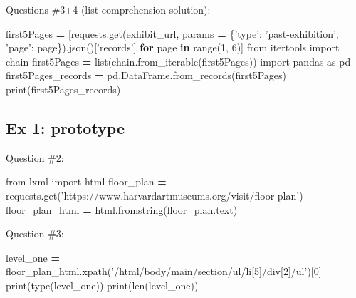 \documentclass[]{book}
\newenvironment{Shaded}{\begin{snugshade}}{\end{snugshade}}
\newcommand{\KeywordTok}[1]{\textcolor[rgb]{0.13,0.29,0.53}{\textbf{#1}}}
\newcommand{\DecValTok}[1]{\textcolor[rgb]{0.00,0.00,0.81}{#1}}
\newcommand{\StringTok}[1]{\textcolor[rgb]{0.31,0.60,0.02}{#1}}
\newcommand{\ImportTok}[1]{#1}
\newcommand{\ControlFlowTok}[1]{\textcolor[rgb]{0.13,0.29,0.53}{\textbf{#1}}}
\newcommand{\OperatorTok}[1]{\textcolor[rgb]{0.81,0.36,0.00}{\textbf{#1}}}
\newcommand{\BuiltInTok}[1]{#1}
\newcommand{\NormalTok}[1]{#1}
\begin{document}
Questions \#3+4 (list comprehension solution):

\begin{Shaded}
\begin{Highlighting}[]
\NormalTok{first5Pages }\OperatorTok{=}\NormalTok{ [requests.get(exhibit_url, params }\OperatorTok{=}\NormalTok{ \{}\StringTok{'type'}\NormalTok{: }\StringTok{'past-exhibition'}\NormalTok{, }\StringTok{'page'}\NormalTok{: page\}).json()[}\StringTok{'records'}\NormalTok{] }\ControlFlowTok{for}\NormalTok{ page }\KeywordTok{in} \BuiltInTok{range}\NormalTok{(}\DecValTok{1}\NormalTok{, }\DecValTok{6}\NormalTok{)]}
\ImportTok{from}\NormalTok{ itertools }\ImportTok{import}\NormalTok{ chain}
\NormalTok{first5Pages }\OperatorTok{=} \BuiltInTok{list}\NormalTok{(chain.from_iterable(first5Pages))}
\ImportTok{import}\NormalTok{ pandas }\ImportTok{as}\NormalTok{ pd}
\NormalTok{first5Pages_records }\OperatorTok{=}\NormalTok{ pd.DataFrame.from_records(first5Pages)}
\BuiltInTok{print}\NormalTok{(first5Pages_records)}
\end{Highlighting}
\end{Shaded}

\subsection{Ex 1: prototype}\label{ex-1-prototype-5}

Question \#2:

\begin{Shaded}
\begin{Highlighting}[]
\ImportTok{from}\NormalTok{ lxml }\ImportTok{import}\NormalTok{ html}
\NormalTok{floor_plan }\OperatorTok{=}\NormalTok{ requests.get(}\StringTok{'https://www.harvardartmuseums.org/visit/floor-plan'}\NormalTok{)}
\NormalTok{floor_plan_html }\OperatorTok{=}\NormalTok{ html.fromstring(floor_plan.text)}
\end{Highlighting}
\end{Shaded}

Question \#3:

\begin{Shaded}
\begin{Highlighting}[]
\NormalTok{level_one }\OperatorTok{=}\NormalTok{ floor_plan_html.xpath(}\StringTok{'/html/body/main/section/ul/li[5]/div[2]/ul'}\NormalTok{)[}\DecValTok{0}\NormalTok{]}
\BuiltInTok{print}\NormalTok{(}\BuiltInTok{type}\NormalTok{(level_one))}
\BuiltInTok{print}\NormalTok{(}\BuiltInTok{len}\NormalTok{(level_one))}
\end{Highlighting}
\end{Shaded}
\end{document}
